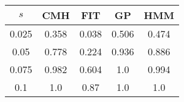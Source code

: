 \centering \begin{tabular}{c|c|c|c|c}
$s$	&CMH	&FIT	&GP	&HMM\\\hline
0.025	&0.358	&0.038	&0.506	&0.474\\
0.05	&0.778	&0.224	&0.936	&0.886\\
0.075	&0.982	&0.604	&1.0	&0.994\\
0.1	&1.0	&0.87	&1.0	&1.0\\
\end{tabular}
